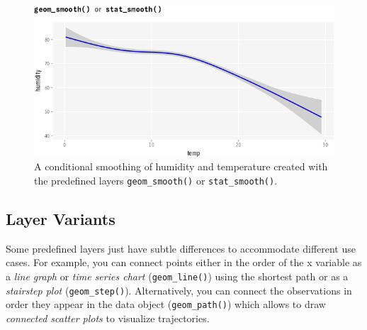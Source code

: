 \documentclass[
]{krantz}
\begin{document}
\begin{figure}
\centering
\includegraphics{bookdown_files/figure-latex/07layerPredefinedDefaultSmooth-1.png}
\caption{\label{fig:07layerPredefinedDefaultSmooth}A conditional smoothing of humidity and temperature created with the predefined layers \texttt{geom\_smooth()} or \texttt{stat\_smooth()}.}
\end{figure}

\hypertarget{layer-variants}{%
\subsection{Layer Variants}\label{layer-variants}}

Some predefined layers just have subtle differences to accommodate different use cases. For example, you can connect points either in the order of the x variable as a \emph{line graph} or \emph{time series chart} (\texttt{geom\_line()}) using the shortest path or as a \emph{stairstep plot} (\texttt{geom\_step()}). Alternatively, you can connect the observations in order they appear in the data object (\texttt{geom\_path()}) which allows to draw \emph{connected scatter plots} to visualize trajectories.
\end{document}
